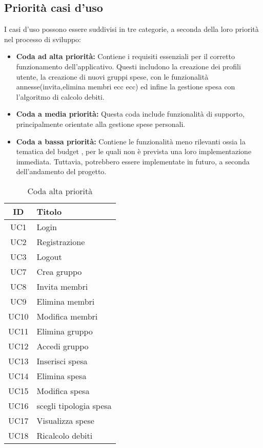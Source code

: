 \subsection{Priorità casi d'uso}
    I casi d'uso possono essere suddivisi in tre categorie, a seconda della loro priorità nel processo di sviluppo:
    \begin{itemize}
        \item \textbf{Coda ad alta priorità:} 
        Contiene i requisiti essenziali per il corretto funzionamento dell'applicativo. Questi includono la creazione dei profili utente, la creazione di nuovi gruppi spese, con le funzionalità annesse(invita,elimina membri ecc ecc) ed infine la gestione spesa con l'algoritmo di calcolo debiti.
    
        \item \textbf{Coda a media priorità:} 
        Questa coda include funzionalità di supporto, principalmente orientate alla gestione spese personali.
    
        \item \textbf{Coda a bassa priorità:} 
        Contiene le funzionalità meno rilevanti ossia la tematica del budget , per le quali non è prevista una loro implementazione immediata. Tuttavia, potrebbero essere implementate in futuro, a seconda dell'andamento del progetto.
    \end{itemize}

    \begin{table}[H]
        \centering
        \begin{tabular}{|c|l|}
        \hline
        \textbf{ID} & \textbf{Titolo} \\ \hline
        UC1 & Login\\ \hline
        UC2 & Registrazione \\ \hline
        UC3 & Logout \\ \hline
        UC7 & Crea gruppo \\ \hline
        UC8 & Invita membri \\ \hline
        UC9 & Elimina membri \\ \hline
        UC10 & Modifica membri \\ \hline
        UC11 & Elimina gruppo \\ \hline
        UC12 & Accedi gruppo \\ \hline
        UC13 & Inserisci spesa \\ \hline
        UC14 & Elimina spesa \\ \hline
        UC15 & Modifica spesa \\ \hline
        UC16 & scegli tipologia spesa \\ \hline
        UC17 & Visualizza spese \\ \hline
        UC18 & Ricalcolo debiti \\ \hline
        \end{tabular}
        \caption{Coda alta priorità}
    \end{table}

